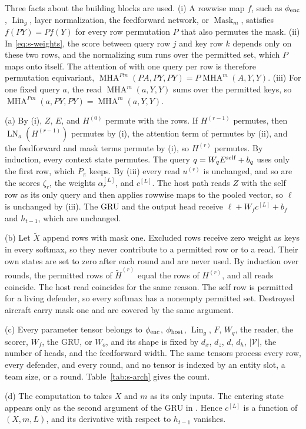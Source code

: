 \begin{IEEEproof}
Three facts about the building blocks are used. (i) A rowwise map $f$, such as $\phi_{\rm enc}$, $\operatorname{Lin}_g$, layer normalization, the feedforward network, or $\operatorname{Mask}_m$, satisfies $f(PY)=Pf(Y)$ for every row permutation $P$ that also permutes the mask. (ii) In \eqref{eq:s-weights}, the score between query row $j$ and key row $k$ depends only on these two rows, and the normalizing sum runs over the permitted set, which $P$ maps onto itself. The attention of  with one query per row is therefore permutation equivariant, $\operatorname{MHA}^{Pm}(PA,PY,PY)=P\operatorname{MHA}^{m}(A,Y,Y)$. (iii) For one fixed query $a$, the read $\operatorname{MHA}^{m}(a,Y,Y)$ sums over the permitted keys, so $\operatorname{MHA}^{Pm}(a,PY,PY)=\operatorname{MHA}^{m}(a,Y,Y)$.

(a) By (i), $Z$, $E$, and $H^{(0)}$ permute with the rows. If $H^{(r-1)}$ permutes, then $\operatorname{LN}_a(H^{(r-1)})$ permutes by (i), the attention term of  permutes by (ii), and the feedforward and mask terms permute by (i), so $H^{(r)}$ permutes. By induction, every context state permutes. The query $q=W_qE^{\rm self}+b_q$ uses only the first row, which $P_\pi$ keeps. By (iii) every read $u^{(r)}$ is unchanged, and so are the scores $\zeta_r$, the weights $\alpha^{[L]}_r$, and $c^{[L]}$. The host path reads $Z$ with the self row as its only query and then applies rowwise maps to the pooled vector, so $\ell$ is unchanged by (iii). The GRU and the output head receive $\ell+W_fc^{[L]}+b_f$ and $h_{t-1}$, which are unchanged.

(b) Let $\tilde X$ append rows with mask one. Excluded rows receive zero weight as keys in every softmax, so they never contribute to a permitted row or to a read. Their own states are set to zero after each round and are never used. By induction over rounds, the permitted rows of $\tilde H^{(r)}$ equal the rows of $H^{(r)}$, and all reads coincide. The host read coincides for the same reason. The self row is permitted for a living defender, so every softmax has a nonempty permitted set. Destroyed aircraft carry mask one and are covered by the same argument.

(c) Every parameter tensor belongs to $\phi_{\rm enc}$, $\phi_{\rm host}$, $\operatorname{Lin}_g$, $F$, $W_q$, the reader, the scorer, $W_f$, the GRU, or $W_o$, and its shape is fixed by $d_x$, $d_z$, $d$, $d_h$, $|\mathcal V|$, the number of heads, and the feedforward width. The same tensors process every row, every defender, and every round, and no tensor is indexed by an entity slot, a team size, or a round. Table~\ref{tab:s-arch} gives the count.

(d) The computation  to  takes $X$ and $m$ as its only inputs. The entering state appears only as the second argument of the GRU in . Hence $c^{[L]}$ is a function of $(X,m,L)$, and its derivative with respect to $h_{t-1}$ vanishes.
\end{IEEEproof}

